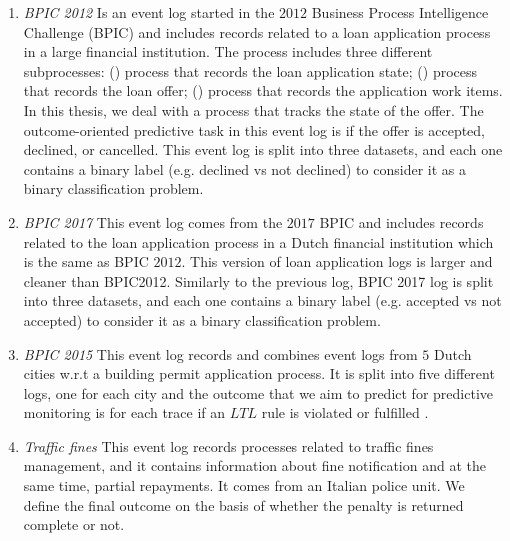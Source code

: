 \begin{enumerate}
	\item \textit{BPIC 2012 }
	 Is an event log started in the $2012$ Business Process Intelligence Challenge (BPIC) and includes records related to a loan application process in a large financial institution. The process includes three different subprocesses: () process that records the loan application state; () process that records the loan offer; () process that records the application work items. In this thesis, we deal with a process that tracks the state of the offer. The outcome-oriented predictive task in this event log is if the offer is accepted, declined, or cancelled. This event log is split into three datasets, and each one contains a binary label (e.g. declined vs not declined) to consider it as a binary classification problem. 
	
	\item \textit{BPIC 2017 }
	This event log comes from the $2017$ BPIC and includes records related to the loan application process in a Dutch financial institution which is the same as BPIC $2012$. This version of loan application logs is larger and cleaner than BPIC2012. Similarly to the previous log, BPIC 2017 log is split into three datasets, and each one contains a binary label (e.g. accepted vs not accepted) to consider it as a binary classification problem. 
	
	\item \textit{BPIC 2015 }
	This event log records and combines event logs from $5$ Dutch cities w.r.t a building permit application process. It is split into five different logs, one for each city and the outcome that we aim to predict for predictive monitoring is for each trace if an $LTL$ rule \cite{pnueli1977temporal} is violated or fulfilled \cite{di2017clustering, gunther2014xes}.
	
	\item \textit{Traffic fines }
	This event log records processes related to traffic fines management, and it contains information about fine notification and at the same time, partial repayments. It comes from an Italian police unit. We define the final outcome on the basis of whether the penalty is returned complete or not.
	
	
	
	

\end{enumerate}
